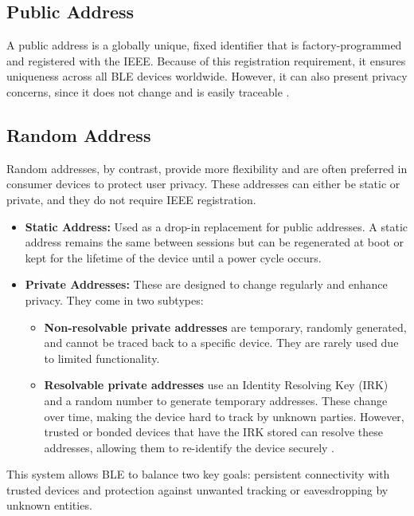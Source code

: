 \subsection{Public Address}

A public address is a globally unique, fixed identifier that is factory-programmed and registered with the IEEE. Because of this registration requirement, it ensures uniqueness across all BLE devices worldwide. However, it can also present privacy concerns, since it does not change and is easily traceable \cite{introtoble}.

\subsection{Random Address}

Random addresses, by contrast, provide more flexibility and are often preferred in consumer devices to protect user privacy. These addresses can either be static or private, and they do not require IEEE registration.

\begin{itemize}
    \item \textbf{Static Address:} Used as a drop-in replacement for public addresses. A static address remains the same between sessions but can be regenerated at boot or kept for the lifetime of the device until a power cycle occurs.
    \item \textbf{Private Addresses:} These are designed to change regularly and enhance privacy. They come in two subtypes:
    \begin{itemize}
        \item \textbf{Non-resolvable private addresses} are temporary, randomly generated, and cannot be traced back to a specific device. They are rarely used due to limited functionality.
        \item \textbf{Resolvable private addresses} use an Identity Resolving Key (IRK) and a random number to generate temporary addresses. These change over time, making the device hard to track by unknown parties. However, trusted or bonded devices that have the IRK stored can resolve these addresses, allowing them to re-identify the device securely \cite{introtoble}.
    \end{itemize}
\end{itemize}

This system allows BLE to balance two key goals: persistent connectivity with trusted devices and protection against unwanted tracking or eavesdropping by unknown entities.


